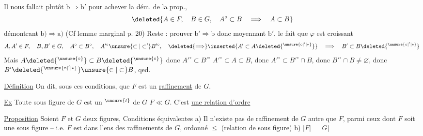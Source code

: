 Il nous fallait plutôt $\mathrm b\Rightarrow\mathrm b'$ pour achever la dém. de la prop.,    
\[ \deleted{A\in F,\quad B\in G,\quad A^\circ\subset B\quad\Longrightarrow\quad A\subset B} \]
   démontrant $\mathrm b)\Rightarrow\mathrm a)$ (Cf lemme marginal p. 20) Reste : prouver $\mathrm b'\Rightarrow\mathrm b$ donc moyennant $\mathrm{b}'$, le fait que $\varphi$ est croissant
\[ A,A'\in F,\quad B,B'\in G,\quad A^\circ\subset B^\circ,\quad A'^\circ\unsure{\subset|\subset'}B'^\circ,\quad \deleted{\Longrightarrow}\inserted{A'\subset A\deleted{{}^{\unsure{\circ|'|*}}}}\quad\Longrightarrow\quad B'\subset B\deleted{{}^{\unsure{\circ|'|*}}} \]
Mais      $A\deleted{{}^{\unsure{\circ}}}\subset B\deleted{{}^{\unsure{\circ}}}$   donc $A'^\circ\subset B'^\circ$ 
$A'^\circ\subset A\subset B$, donc $A'^\circ\subset B'^\circ\cap B$, donc $B'^\circ\cap B\ne\varnothing$, donc $B'\deleted{{}^{\unsure{\circ|'|*}}}\unsure{\in|\subset}B$, qed.

\uline{Définition} On dit, sous ces conditions, que $F$ est un \uline{raffinement} de $G$.

\uline{Ex} Toute sous figure de $G$ est un $^{\unsure{t}}$ de $G$
 $F\ll G$. C'est \uline{une relation d'ordre}

\uline{Proposition} Soient $F$ et $G$ deux figures,  Conditions équivalentes
a)  Il n'existe pas de raffinement de $G$ autre que $F$, parmi ceux dont $F$ soit une sous figure -- i.e. $F$ est  dans l'ens des raffinements de $G$, ordonné  $\leq$ (relation de sous figure)
b)  $|F|=|G|$ 
